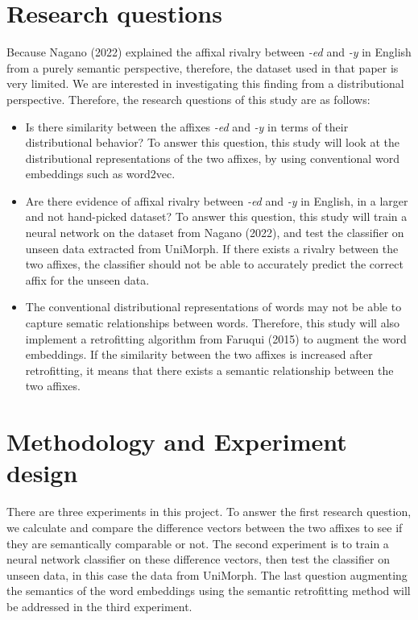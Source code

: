 \documentclass[12pt]{article}
\begin{document}
\section{Research questions}
    Because Nagano (2022) explained the affixal rivalry between \emph{-ed} and \emph{-y} in English from a purely semantic perspective, therefore, the dataset used in that paper is very limited. We are interested in investigating this finding from a distributional perspective. Therefore, the research questions of this study are as follows:
    \begin{itemize}
        \item Is there similarity between the affixes \emph{-ed} and \emph{-y} in terms of their distributional behavior? To answer this question, this study will look at the distributional representations of the two affixes, by using conventional word embeddings such as word2vec.
        \item Are there evidence of affixal rivalry between \emph{-ed} and \emph{-y} in English, in a larger and not hand-picked dataset? To answer this question, this study will train a neural network on the dataset from Nagano (2022), and test the classifier on unseen data extracted from UniMorph. If there exists a rivalry between the two affixes, the classifier should not be able to accurately predict the correct affix for the unseen data.
        \item The conventional distributional representations of words may not be able to capture sematic relationships between words. Therefore, this study will also implement a retrofitting algorithm from Faruqui (2015) to augment the word embeddings. If the similarity between the two affixes is increased after retrofitting, it means that there exists a semantic relationship between the two affixes.
    \end{itemize}

\section{Methodology and Experiment design}
There are three experiments in this project. To answer the first research question, we calculate and compare the difference vectors between the two affixes to see if they are semantically comparable or not. The second experiment is to train a neural network classifier on these difference vectors, then test the classifier on unseen data, in this case the data from UniMorph. The last question augmenting the semantics of the word embeddings using the semantic retrofitting method will be addressed in the third experiment.
\end{document}
